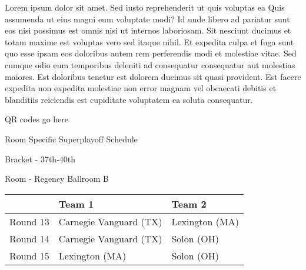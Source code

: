 \documentclass{article}%
\begin{document}
\vspace*{8pt}%
\newline%
Lorem ipsum dolor sit amet. Sed iusto reprehenderit ut quis voluptas ea Quis assumenda ut eius magni eum voluptate modi? Id unde libero ad pariatur sunt eos nisi possimus est omnis nisi ut internos laboriosam. Sit nesciunt ducimus et totam maxime est voluptas vero sed itaque nihil. Et expedita culpa et fuga sunt quo esse ipsam eos doloribus autem rem perferendis modi et molestiae vitae.\newline%
\newline%
Sed cumque odio eum temporibus deleniti ad consequatur consequatur aut molestias maiores. Est doloribus tenetur est dolorem ducimus sit quasi provident. Est facere expedita non expedita molestiae non error magnam vel obcaecati debitis et blanditiis reiciendis est cupiditate voluptatem ea soluta consequatur.%
\vspace*{140pt}%
\begin{center}%
\begin{Huge}%
QR codes go here%
\end{Huge}%
\end{center}%
\newpage%
\begin{center}%
\begin{Huge}%
Room Specific Superplayoff Schedule%
\end{Huge}%
\vspace*{8pt}%
\linebreak%
\begin{Large}%
Bracket {-} 37th{-}40th%
\end{Large}%
\vspace*{8pt}%
\linebreak%
\vspace*{8pt}%
\begin{Large}%
Room {-} Regency Ballroom B%
\end{Large}%
\end{center}%
%
\begin{tabularx}{\textwidth}{|c|Y|Y|}%
\hline%
&Team 1&Team 2\\%
\hline%
Round 13&Carnegie Vanguard (TX)&Lexington (MA)\\%
Round 14&Carnegie Vanguard (TX)&Solon (OH)\\%
Round 15&Lexington (MA)&Solon (OH)\\%
\hline%
\end{tabularx}%
\vspace*{8pt}%
\newline%
\end{document}

